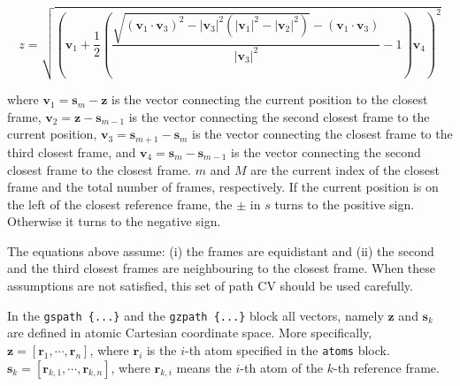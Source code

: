 \begin{equation}
z = \sqrt{\left(\mathbf{v}_1 + \frac{1}{2}\left(\frac{\sqrt{(\mathbf{v}_1 \cdot \mathbf{v}_3)^2-|\mathbf{v}_3|^2 (|\mathbf{v}_1|^2 - |\mathbf{v}_2|^2)}-(\mathbf{v}_1 \cdot \mathbf{v}_3)}{|\mathbf{v}_3|^2} -1 \right)\mathbf{v}_4 \right)^2}
\end{equation}

where $\mathbf{v}_1 = \mathbf{s}_{m} - \mathbf{z} $ is the vector connecting the current position to the closest frame, $\mathbf{v}_2 = \mathbf{z} - \mathbf{s}_{m-1}$ is the vector connecting the second closest frame to the current position, $\mathbf{v}_3 = \mathbf{s}_{m+1} - \mathbf{s}_{m}$ is the vector connecting the closest frame to the third closest frame, and $\mathbf{v}_4 = \mathbf{s}_m - \mathbf{s}_{m-1}$ is the vector connecting the second closest frame to the closest frame. $m$ and $M$ are the current index of the closest frame and the total number of frames, respectively. If the current position is on the left of the closest reference frame, the $\pm$ in $s$ turns to the positive sign. Otherwise it turns to the negative sign.

The equations above assume: (i) the frames are equidistant and (ii) the second and the third closest frames are neighbouring to the closest frame. When these assumptions are not satisfied, this set of path CV should be used carefully.


In the \texttt{gspath~\{...\}} and the \texttt{gzpath~\{...\}} block all vectors, namely $\mathbf{z}$ and $\mathbf{s}_{k}$ are defined in atomic Cartesian coordinate space. More specifically, $\mathbf{z} = \left[\mathbf{r}_{1}, \cdots, \mathbf{r}_{n}\right]$, where $\mathbf{r}_{i}$ is the $i$-th atom specified in the \texttt{atoms} block. $\mathbf{s}_{k} = \left[\mathbf{r}_{k,1}, \cdots, \mathbf{r}_{k,n}\right]$, where $\mathbf{r}_{k,i}$ means the $i$-th atom of the $k$-th reference frame.

